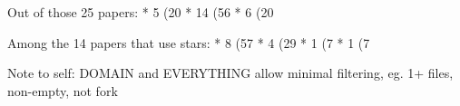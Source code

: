 Out of those 25 papers:
* 5 (20%
* 14 (56%
* 6 (20%

Among the 14 papers that use stars:
* 8 (57%
* 4 (29%
* 1 (7%
* 1 (7%

Note to self: DOMAIN and EVERYTHING allow minimal filtering, eg. 1+ files, non-empty, not fork

%
%
%
%
%
%
%
%
%
%
%

